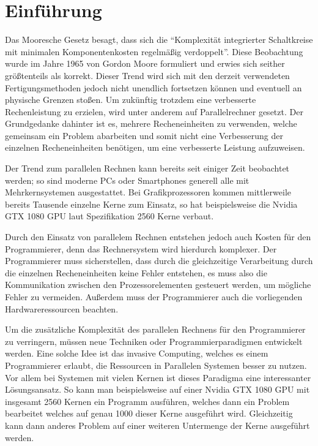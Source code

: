 \chapter{Einführung}\label{sec:intro}

Das Mooresche Gesetz besagt, dass sich die 
"`Komplexität integrierter Schaltkreise mit minimalen Komponentenkosten regelmäßig verdoppelt"'\cite{mooresLawWikiDe}.
Diese Beobachtung wurde im Jahre 1965 von Gordon Moore formuliert und erwies sich seither größtenteils als
korrekt\cite{mooresLawWikiDe}.
Dieser Trend wird sich mit den derzeit verwendeten Fertigungsmethoden jedoch nicht unendlich fortsetzen können und eventuell an
physische Grenzen stoßen. Um zukünftig trotzdem eine verbesserte Rechenleistung zu erzielen, wird unter anderem auf
Parallelrechner gesetzt. Der Grundgedanke dahinter ist es, mehrere Recheneinheiten zu verwenden, welche gemeinsam ein Problem
abarbeiten und somit nicht eine Verbesserung der einzelnen Recheneinheiten benötigen, um eine verbesserte Leistung aufzuweisen.

Der Trend zum parallelen Rechnen kann bereits seit einiger Zeit beobachtet werden; so sind moderne PCs oder Smartphones
generell alle mit Mehrkernsystemen ausgestattet. Bei Grafikprozessoren kommen mittlerweile bereits Tausende einzelne Kerne
zum Einsatz, so hat beispielsweise die Nvidia GTX 1080 GPU laut Spezifikation \cite{nvidia1080specs} 2560 Kerne verbaut.

Durch den Einsatz von parallelem Rechnen entstehen jedoch auch Kosten für den Programmierer, denn das Rechnersystem wird
hierdurch komplexer. Der Programmierer muss sicherstellen, dass durch die gleichzeitige Verarbeitung durch die einzelnen
Recheneinheiten keine Fehler entstehen, es muss also die Kommunikation zwischen den Prozessorelementen gesteuert werden, um mögliche
Fehler zu vermeiden. Außerdem muss der Programmierer auch die vorliegenden Hardwareressourcen beachten.

Um die zusätzliche Komplexität des parallelen Rechnens für den Programmierer zu verringern, müssen neue Techniken oder
Programmierparadigmen entwickelt werden. Eine solche Idee ist das invasive Computing, welches es einem Programmierer
erlaubt, die Ressourcen in Parallelen Systemen besser zu nutzen. Vor allem bei Systemen mit vielen Kernen ist dieses Paradigma
eine interessanter Lösungsansatz. So kann man beispielsweise auf einer Nvidia GTX 1080 GPU mit insgesamt 2560 Kernen ein Programm
ausführen, welches dann ein Problem bearbeitet welches auf genau 1000 dieser Kerne ausgeführt wird. Gleichzeitig kann dann anderes
Problem auf einer weiteren Untermenge der Kerne ausgeführt werden.

